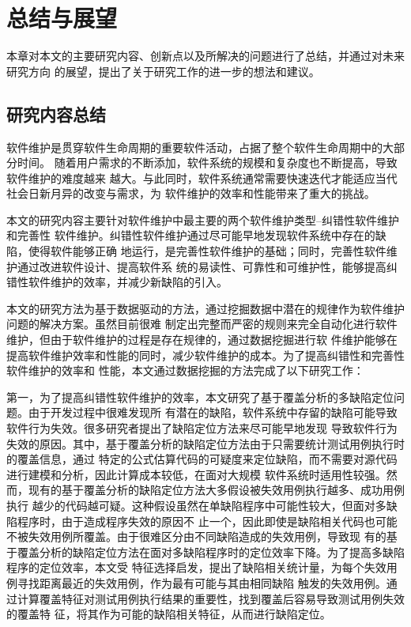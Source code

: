 \chapter{总结与展望}
本章对本文的主要研究内容、创新点以及所解决的问题进行了总结，并通过对未来研究方向
的展望，提出了关于研究工作的进一步的想法和建议。

\section{研究内容总结}
软件维护是贯穿软件生命周期的重要软件活动，占据了整个软件生命周期中的大部分时间。
随着用户需求的不断添加，软件系统的规模和复杂度也不断提高，导致软件维护的难度越来
越大。与此同时，软件系统通常需要快速迭代才能适应当代社会日新月异的改变与需求，为
软件维护的效率和性能带来了重大的挑战。

本文的研究内容主要针对软件维护中最主要的两个软件维护类型--纠错性软件维护和完善性
软件维护。纠错性软件维护通过尽可能早地发现软件系统中存在的缺陷，使得软件能够正确
地运行，是完善性软件维护的基础；同时，完善性软件维护通过改进软件设计、提高软件系
统的易读性、可靠性和可维护性，能够提高纠错性软件维护的效率，并减少新缺陷的引入。

本文的研究方法为基于数据驱动的方法，通过挖掘数据中潜在的规律作为软件维护问题的解决方案。虽然目前很难
制定出完整而严密的规则来完全自动化进行软件维护，但由于软件维护的过程是存在规律的，通过数据挖掘进行软
件维护能够在提高软件维护效率和性能的同时，减少软件维护的成本。为了提高纠错性和完善性软件维护的效率和
性能，本文通过数据挖掘的方法完成了以下研究工作：

第一，为了提高纠错性软件维护的效率，本文研究了基于覆盖分析的多缺陷定位问题。由于开发过程中很难发现所
有潜在的缺陷，软件系统中存留的缺陷可能导致软件行为失效。很多研究者提出了缺陷定位方法来尽可能早地发现
导致软件行为失效的原因。其中，基于覆盖分析的缺陷定位方法由于只需要统计测试用例执行时的覆盖信息，通过
特定的公式估算代码的可疑度来定位缺陷，而不需要对源代码进行建模和分析，因此计算成本较低，在面对大规模
软件系统时适用性较强。然而，现有的基于覆盖分析的缺陷定位方法大多假设被失效用例执行越多、成功用例执行
越少的代码越可疑。这种假设虽然在单缺陷程序中可能性较大，但面对多缺陷程序时，由于造成程序失效的原因不
止一个，因此即使是缺陷相关代码也可能不被失效用例所覆盖。由于很难区分由不同缺陷造成的失效用例，导致现
有的基于覆盖分析的缺陷定位方法在面对多缺陷程序时的定位效率下降。为了提高多缺陷程序的定位效率，本文受
特征选择启发，提出了缺陷相关统计量，为每个失效用例寻找距离最近的失效用例，作为最有可能与其由相同缺陷
触发的失效用例。通过计算覆盖特征对测试用例执行结果的重要性，找到覆盖后容易导致测试用例失效的覆盖特
征，将其作为可能的缺陷相关特征，从而进行缺陷定位。


